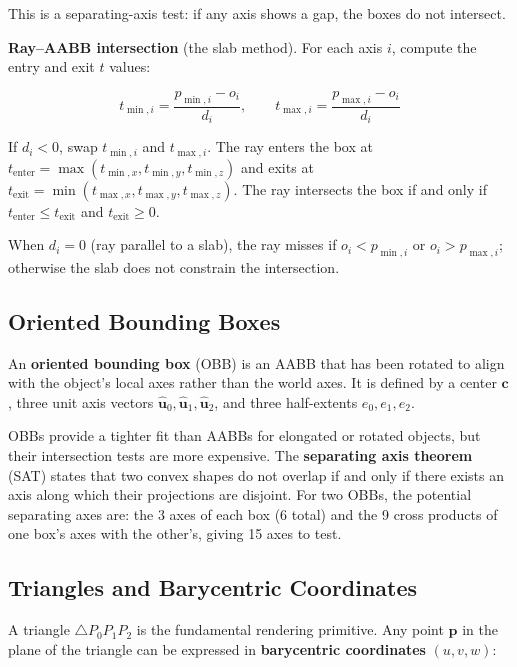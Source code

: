 \documentclass[
  11pt,
  letterpaper,
  DIV=11,
  numbers=noendperiod,
  twoside,
  open=right]{scrreprt}
\begin{document}
This is a separating-axis test: if any axis shows a gap, the boxes do
not intersect.

\textbf{Ray--AABB intersection} (the slab method). For each axis \(i\),
compute the entry and exit \(t\) values:

\[
t_{\min,i} = \frac{p_{\min,i} - o_i}{d_i}, \qquad t_{\max,i} = \frac{p_{\max,i} - o_i}{d_i}
\]

If \(d_i < 0\), swap \(t_{\min,i}\) and \(t_{\max,i}\). The ray enters
the box at
\(t_{\text{enter}} = \max(t_{\min,x}, t_{\min,y}, t_{\min,z})\) and
exits at \(t_{\text{exit}} = \min(t_{\max,x}, t_{\max,y}, t_{\max,z})\).
The ray intersects the box if and only if
\(t_{\text{enter}} \leq t_{\text{exit}}\) and
\(t_{\text{exit}} \geq 0\).

When \(d_i = 0\) (ray parallel to a slab), the ray misses if
\(o_i < p_{\min,i}\) or \(o_i > p_{\max,i}\); otherwise the slab does
not constrain the intersection.

\subsection{Oriented Bounding Boxes}\label{oriented-bounding-boxes}

An \textbf{oriented bounding box} (OBB) is an AABB that has been rotated
to align with the object's local axes rather than the world axes. It is
defined by a center \(\mathbf{c}\), three unit axis vectors
\(\hat{\mathbf{u}}_0, \hat{\mathbf{u}}_1, \hat{\mathbf{u}}_2\), and
three half-extents \(e_0, e_1, e_2\).

OBBs provide a tighter fit than AABBs for elongated or rotated objects,
but their intersection tests are more expensive. The \textbf{separating
axis theorem} (SAT) states that two convex shapes do not overlap if and
only if there exists an axis along which their projections are disjoint.
For two OBBs, the potential separating axes are: the 3 axes of each box
(6 total) and the 9 cross products of one box's axes with the other's,
giving 15 axes to test.

\subsection{Triangles and Barycentric
Coordinates}\label{triangles-and-barycentric-coordinates}

A triangle \(\triangle P_0 P_1 P_2\) is the fundamental rendering
primitive. Any point \(\mathbf{p}\) in the plane of the triangle can be
expressed in \textbf{barycentric coordinates} \((u, v, w)\):
\end{document}
